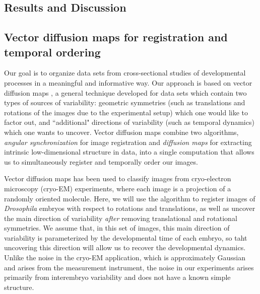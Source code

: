 \documentclass{pnastwo}
\begin{document}
\begin{article}
\section{Results and Discussion}

\subsection{Vector diffusion maps for registration and temporal ordering}

%
Our goal is to organize data sets from cross-sectional studies of developmental processes in a meaningful and informative way.
%
%
Our approach is based on vector diffusion maps \cite{singer2012vector}, a general technique developed for data sets which contain two types of sources of variability:
geometric symmetries (such as translations and rotations of the images due to the experimental setup) which one would like to factor out,
and ``additional" directions of variability (such as temporal dynamics) which one wants to uncover.
%
Vector diffusion maps combine two algorithms, {\em angular synchronization} \cite{singer2011angular} for image registration and {\em diffusion maps} \cite{coifman2005geometric} for extracting intrinsic low-dimensional structure in data, into a single computation that allows us to simultaneously register and temporally order our images.
%

Vector diffusion maps has been used to classify images from cryo-electron microscopy (cryo-EM) experiments, where each image is a projection of a randomly oriented molecule.
%
Here, we will use the algorithm to register images of {\it Drosophila} embryos with respect to rotations and translations, as well as uncover the main direction of variability {\it after} removing translational and rotational symmetries.
%
We assume that, in this set of images, this main direction of variability is parameterized by the developmental time of each embryo, so taht uncovering this direction will allow us to recover the developmental dynamics.
%
Unlike the noise in the cryo-EM application, which is approximately Gaussian and arises from the measurement instrument, the noise in our experiments arises primarily from interembryo variability and does not have a known simple structure.


\end{article}
\end{document}
